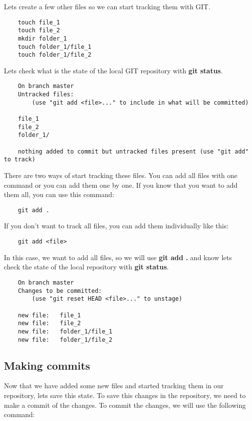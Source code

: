 \documentclass{article}
\begin{document}
Lets create a few other files so we can start tracking them with GIT.

\begin{lstlisting}
	touch file_1
	touch file_2
	mkdir folder_1
	touch folder_1/file_1
	touch folder_1/file_2
\end{lstlisting}

Lets check what is the state of the local GIT repository with \textbf{git status}.

\begin{lstlisting}
	On branch master
	Untracked files:
		(use "git add <file>..." to include in what will be committed)

	file_1
	file_2
	folder_1/

	nothing added to commit but untracked files present (use "git add" to track)
\end{lstlisting}

There are two ways of start tracking these files. You can add all files with one command or you can add them one by one. If you know that you want to add them all, you can use this command:

\begin{lstlisting}
	git add .
\end{lstlisting}

If you don't want to track all files, you can add them individually like this:

\begin{lstlisting}
	git add <file>
\end{lstlisting}

In this case, we want to add all files, so we will use \textbf{git add .} and know lets check the state of the local repository with \textbf{git status}.

\begin{lstlisting}
	On branch master
	Changes to be committed:
  		(use "git reset HEAD <file>..." to unstage)

	new file:   file_1
	new file:   file_2
	new file:   folder_1/file_1
	new file:   folder_1/file_2
\end{lstlisting}

\subsection{Making commits}

Now that we have added some new files and started tracking them in our repository, lets save this state. To save this changes in the repository, we need to make a commit of the changes. To commit the changes, we will use the following command:
\end{document}
